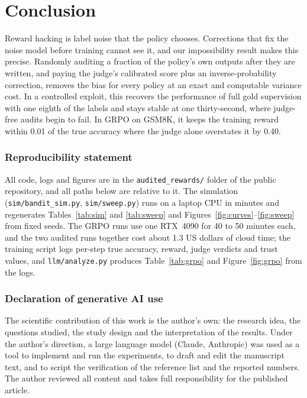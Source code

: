 \section{Conclusion}
\label{sec:conclusion}

Reward hacking is label noise that the policy chooses. Corrections that fix the noise model before training cannot see it, and our impossibility result makes this precise. Randomly auditing a fraction of the policy's own outputs after they are written, and paying the judge's calibrated score plus an inverse-probability correction, removes the bias for every policy at an exact and computable variance cost. In a controlled exploit, this recovers the performance of full gold supervision with one eighth of the labels and stays stable at one thirty-second, where judge-free audits begin to fail. In GRPO on GSM8K, it keeps the training reward within 0.01 of the true accuracy where the judge alone overstates it by 0.40.

\subsubsection*{Reproducibility statement}
All code, logs and figures are in the \texttt{audited\_rewards/} folder of the public repository, and all paths below are relative to it. The simulation (\texttt{sim/bandit\_sim.py}, \texttt{sim/sweep.py}) runs on a laptop CPU in minutes and regenerates Tables~\ref{tab:sim} and \ref{tab:sweep} and Figures~\ref{fig:curves}--\ref{fig:sweep} from fixed seeds. The GRPO runs use one RTX~4090 for 40 to 50 minutes each, and the two audited runs together cost about 1.3 US dollars of cloud time; the training script logs per-step true accuracy, reward, judge verdicts and trust values, and \texttt{llm/analyze.py} produces Table~\ref{tab:grpo} and Figure~\ref{fig:grpo} from the logs.

\subsubsection*{Declaration of generative AI use}
The scientific contribution of this work is the author's own: the research idea, the questions studied, the study design and the interpretation of the results. Under the author's direction, a large language model (Claude, Anthropic) was used as a tool to implement and run the experiments, to draft and edit the manuscript text, and to script the verification of the reference list and the reported numbers. The author reviewed all content and takes full responsibility for the published article.

